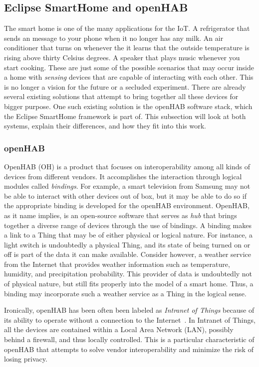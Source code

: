 \documentclass[12pt]{article}
\begin{document}
\subsection{Eclipse SmartHome and openHAB}

The smart home is one of the many applications for the IoT. A refrigerator that sends an message to your phone when it no longer has any milk. An air conditioner that turns on whenever the it learns that the outside temperature is rising above thirty Celsius degrees. A speaker that plays music whenever you start cooking. These are just some of the possible scenarios that may occur inside a home with \emph{sensing} devices that are capable of interacting with each other. This is no longer a vision for the future or a secluded experiment. There are already several existing solutions that attempt to bring together all these devices for bigger purpose. One such existing solution is the openHAB software stack, which the Eclipse SmartHome framework is part of. This subsection will look at both systems, explain their differences, and how they fit into this work. 

\subsubsection{openHAB}

OpenHAB (OH) is a product that focuses on interoperability among all kinds of devices from different vendors. It accomplishes the interaction through logical modules called \emph{bindings}. For example, a smart television from Samsung may not be able to interact with other devices out of box, but it may be able to do so if the appropriate binding is developed for the openHAB environment. OpenHAB, as it name implies, is an open-source software that serves as \emph{hub} that brings together a diverse range of devices through the use of bindings. A binding makes a link to a Thing that may be of either physical or logical nature. For instance, a light switch is undoubtedly a physical Thing, and its state of being turned on or off is part of the data it can make available. Consider however, a weather service from the Internet that provides weather information such as temperature, humidity, and precipitation probability. This provider of data is undoubtedly not of physical nature, but still fits properly into the model of a smart home. Thus, a binding may incorporate such a weather service as a Thing in the logical sense.

Ironically, openHAB has been often been labeled as \emph{Intranet of Things} because of its ability to operate without a connection to the Internet~\cite{openhab_03}. In Intranet of Things, all the devices are contained within a Local Area Network (LAN), possibly behind a firewall, and thus locally controlled. This is a particular characteristic of openHAB that attempts to solve vendor interoperability and minimize the risk of losing privacy.
\end{document}
